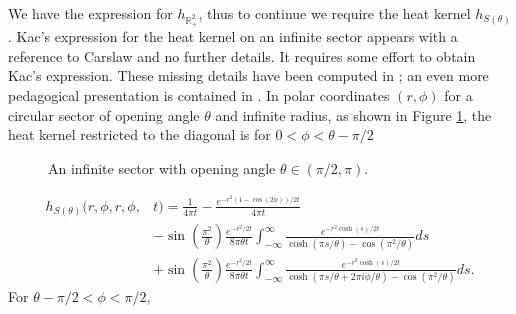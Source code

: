 \documentclass{amsart}
\theoremstyle{definition}
\newcommand*{\R}{\mathbb{R}}
\begin{document}
We have the expression for $h_{\R_+ ^2}$, thus to continue we require the heat kernel $h_{S(\theta)}$. Kac's expression for the heat kernel on an infinite sector appears with a reference to Carslaw \cite{carslaw1910green} and no further details.  It requires some effort to obtain Kac's expression.  These missing details have been computed in \cite[\S6]{aldana2018polyakov}; an even more pedagogical presentation is contained in \cite[p. 40-44]{maardby2023mathematics}. In polar coordinates $(r, \phi)$ for a circular sector of opening angle $\theta$ and infinite radius, as shown in Figure \ref{fig:infinite_sector}, the heat kernel restricted to the diagonal is for $0 < \phi < \theta - \pi/2$ 
\begin{figure}
\centering
{}
\caption{An infinite sector with opening angle $\theta \in (\pi/2, \pi)$.}
\label{fig:infinite_sector}
\end{figure}
\begin{equation} \label{eq:heatkernel_sector1}
    \begin{split}
        h_{S(\theta)}(r,\phi,r,\phi,&t) = \frac{1}{4\pi t} - \frac{e^{-r^2(1-\cos(2\phi))/2t}}{4\pi t} \\
        &-\sin\left(\frac{\pi^2}{\theta}\right) \frac{e^{-r^2/2t}}{8\pi\theta t} \int_{-\infty}^\infty \frac{e^{-r^2\cosh(s)/2t}}{\cosh(\pi s/\theta) - \cos(\pi^2/\theta)} ds \\
        &+\sin\left(\frac{\pi^2}{\theta}\right) \frac{e^{-r^2/2t}}{8\pi\theta t} \int_{-\infty}^\infty \frac{e^{-r^2\cosh(s)/2t}}{\cosh(\pi s/\theta + 2\pi i\phi/\theta) - \cos(\pi^2/\theta)} ds.
    \end{split}
\end{equation}
For $\theta - \pi/2 < \phi < \pi/2$, 
\end{document}

